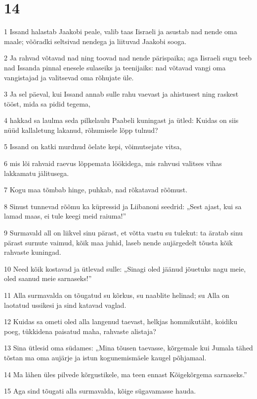 \chapter{14}

\par 1 Issand halastab Jaakobi peale, valib taas Iisraeli ja asustab nad nende oma maale; võõradki seltsivad nendega ja liituvad Jaakobi sooga.
\par 2 Ja rahvad võtavad nad ning toovad nad nende pärispaika; aga Iisraeli sugu teeb nad Issanda pinnal enesele sulaseiks ja teenijaiks: nad võtavad vangi oma vangistajad ja valitsevad oma rõhujate üle.
\par 3 Ja sel päeval, kui Issand annab sulle rahu vaevast ja ahistusest ning raskest tööst, mida sa pidid tegema,
\par 4 hakkad sa laulma seda pilkelaulu Paabeli kuningast ja ütled: Kuidas on siis nüüd kallaletung lakanud, rõhumisele lõpp tulnud?
\par 5 Issand on katki murdnud õelate kepi, võimutsejate vitsa,
\par 6 mis lõi rahvaid raevus lõppemata löökidega, mis rahvusi valitses vihas lakkamatu jälitusega.
\par 7 Kogu maa tõmbab hinge, puhkab, nad rõkatavad rõõmust.
\par 8 Sinust tunnevad rõõmu ka küpressid ja Liibanoni seedrid: „Sest ajast, kui sa lamad maas, ei tule keegi meid raiuma!”
\par 9 Surmavald all on liikvel sinu pärast, et võtta vastu su tulekut: ta äratab sinu pärast surnute vaimud, kõik maa juhid, laseb nende aujärgedelt tõusta kõik rahvaste kuningad.
\par 10 Need kõik kostavad ja ütlevad sulle: „Sinagi oled jäänud jõuetuks nagu meie, oled saanud meie sarnaseks!”
\par 11 Alla surmavalda on tõugatud su kõrkus, su naablite helinad; su Alla on laotatud ussikesi ja sind katavad vaglad.
\par 12 Kuidas sa ometi oled alla langenud taevast, helkjas hommikutäht, koidiku poeg, tükkidena paisatud maha, rahvaste alistaja?
\par 13 Sina ütlesid oma südames: „Mina tõusen taevasse, kõrgemale kui Jumala tähed tõstan ma oma aujärje ja istun kogunemismäele kaugel põhjamaal.
\par 14 Ma lähen üles pilvede kõrgustikele, ma teen ennast Kõigekõrgema sarnaseks.”
\par 15 Aga sind tõugati alla surmavalda, kõige sügavamasse hauda.
